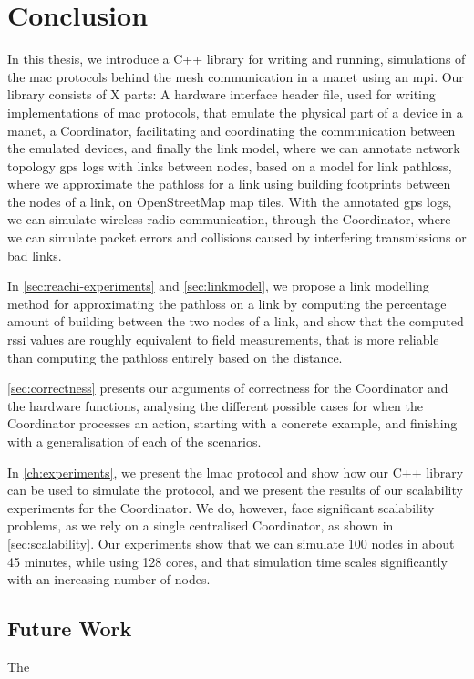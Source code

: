 \chapter{Conclusion}\label{ch:conclusion}
In this thesis, we introduce a C++ library for writing and running, simulations of the \gls{mac} protocols
behind the mesh communication in a \gls{manet} using an \gls{mpi}. Our library consists of X parts: A hardware
interface header file, used for writing implementations of \gls{mac} protocols, that emulate the physical part
of a device in a \gls{manet}, a Coordinator, facilitating and coordinating the communication between the
emulated devices, and finally the link model, where we can annotate network topology \gls{gps} logs with links
between nodes, based on a model for link \gls{pathloss}, where we approximate the \gls{pathloss} for a link
using building footprints between the nodes of a link, on OpenStreetMap map tiles. With the annotated
\gls{gps} logs, we can simulate wireless radio communication, through the Coordinator, where we can
simulate packet errors and collisions caused by interfering transmissions or bad links. \smallbreak

In \autoref{sec:reachi-experiments} and \autoref{sec:linkmodel}, we propose a link modelling method for
approximating the \gls{pathloss} on a link by computing the percentage amount of building between the two
nodes of a link, and show that the computed \gls{rssi} values are roughly equivalent to field measurements,
that is more reliable than computing the \gls{pathloss} entirely based on the distance. \smallbreak

\autoref{sec:correctness} presents our arguments of correctness for the Coordinator and the hardware
functions, analysing the different possible cases for when the Coordinator processes an action, starting with 
a concrete example, and finishing with a generalisation of each of the scenarios. \smallbreak

In \autoref{ch:experiments}, we present the \gls{lmac} protocol and show how our C++ library can be used to
simulate the protocol, and we present the results of our scalability experiments for the Coordinator. We do,
however, face significant scalability problems, as we rely on a single centralised Coordinator, as shown in
\autoref{sec:scalability}. Our experiments show that we can simulate 100 nodes in about 45 minutes, while
using 128 cores, and that simulation time scales significantly with an increasing number of nodes.


\section{Future Work}
The 
